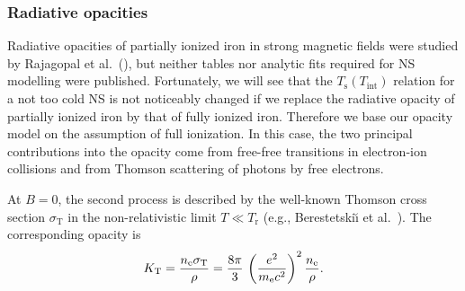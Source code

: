 \documentclass{aa}
\begin{document}
\subsubsection{Radiative opacities}
%
Radiative opacities of partially ionized iron in strong magnetic fields
were studied by Rajagopal et al.\ (\cite{RRM}), but 
neither tables nor analytic fits required
for NS modelling were published.
Fortunately, we will see that
the $T_\mathrm{s}(T_\mathrm{int})$
relation for a not too cold NS
is not noticeably changed if we replace
the radiative opacity of partially ionized iron by that of 
fully ionized iron.
Therefore we base our opacity model on the assumption of 
full ionization. In this case, the two principal contributions
into the opacity
come from free-free transitions 
in electron-ion collisions and from Thomson
scattering of photons by free electrons.

At $B=0$, the second process is described by
the well-known Thomson cross section $\sigma_\mathrm{T}$
in the non-relativistic limit $T\ll T_\mathrm{r}$
(e.g., Berestetski\u{\i} et al.\ \cite{QED}).
The corresponding opacity is 
%
\begin{equation}
   K_\mathrm{T}={n_\mathrm{e}\sigma_\mathrm{T} \over \rho} =
         {8\pi\over3}\,\left({e^2\over m_\mathrm{e} c^2}\right)^2
         {n_\mathrm{e} \over \rho}.
 \label{Thomson}
\end{equation}
\end{document}
